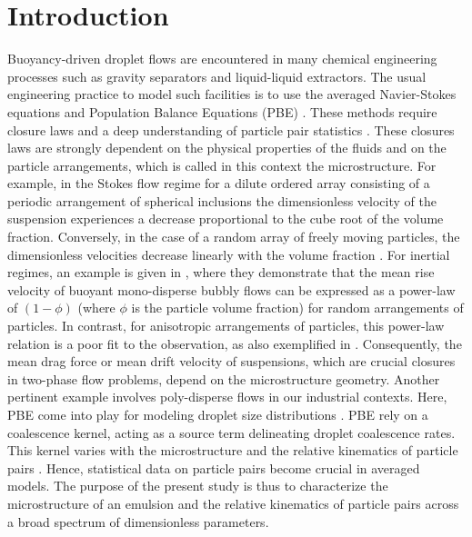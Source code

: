 \section{Introduction}

Buoyancy-driven droplet flows are encountered in many chemical engineering processes such as gravity separators and liquid-liquid extractors. 
The usual engineering practice to model such facilities is to use the averaged Navier-Stokes equations and Population Balance Equations (PBE) \citep{castellano2019}. %
These methods require closure laws and a deep understanding of particle pair statistics \citep{simonin1996}.
These closures laws are strongly dependent on the physical properties of the fluids and on the particle arrangements, which is called in this context the microstructure. 
For example, in the Stokes flow regime for a dilute ordered array consisting of a periodic arrangement of spherical inclusions the dimensionless velocity of the suspension experiences a decrease proportional to the cube root of the volume fraction. 
Conversely, in the case of a random array of freely moving particles, the dimensionless velocities decrease linearly with the volume fraction \citep{saffman1973}.
For inertial regimes, an example is given in \citet{yin2008lattice}, where they demonstrate that the mean rise velocity of buoyant mono-disperse bubbly flows can be expressed as a power-law of $(1-\phi)$ (where $\phi$ is the particle volume fraction) for random arrangements of particles.
In contrast, for anisotropic arrangements of particles, this power-law relation is a poor fit to the observation, as also exemplified in \citet{loisy2017}.  
Consequently, the mean drag force or mean drift velocity of suspensions, which are crucial closures in two-phase flow problems, depend on the microstructure geometry.  
Another pertinent example involves poly-disperse flows in our industrial contexts. 
Here, PBE come into play for modeling droplet size distributions \citep{randolph2012theory}. 
PBE rely on a coalescence kernel, acting as a source term delineating droplet coalescence rates. 
This kernel varies with the microstructure and the relative kinematics of particle pairs \citep{chesters1991modelling}.
Hence, statistical data on particle pairs become crucial in averaged models. 
The purpose of the present study is thus to characterize the microstructure of an emulsion and the relative kinematics of particle pairs across a broad spectrum of dimensionless parameters. %

